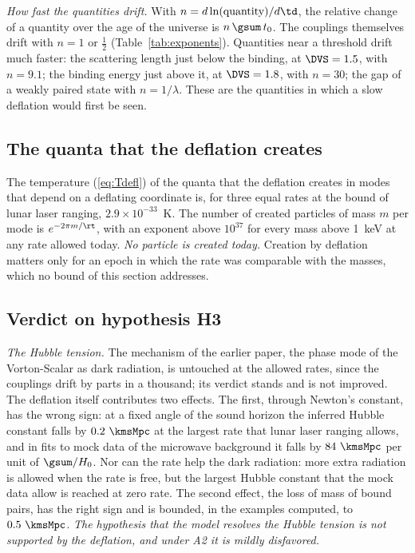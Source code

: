 \emph{How fast the quantities drift.} With $n=d\ln(\text{quantity})/d\td$, the relative change of a
quantity over the age of the universe is $n\,\gsum\,t_0$. The couplings themselves drift with $n=1$
or $\tfrac12$ (Table~\ref{tab:exponents}). Quantities near a threshold drift much faster: the
scattering length just below the binding, at $\DVS=1.5$, with $n=9.1$; the binding energy just above
it, at $\DVS=1.8$, with $n=30$; the gap of a weakly paired state with $n=1/\lambda$. These are the
quantities in which a slow deflation would first be seen.

\subsection{The quanta that the deflation creates}

The temperature (\ref{eq:Tdefl}) of the quanta that the deflation creates in modes that depend on a
deflating coordinate is, for three equal rates at the bound of lunar laser ranging,
$2.9\times10^{-33}$~K. The number of created particles of mass $m$ per mode is $e^{-2\pi m/\rt}$, with an
exponent above $10^{37}$ for every mass above 1~keV at any rate allowed today. \emph{No particle is
created today.} Creation by deflation matters only for an epoch in which the rate was comparable
with the masses, which no bound of this section addresses.

\subsection{Verdict on hypothesis H3}

\emph{The Hubble tension.} The mechanism of the earlier paper, the phase mode of the Vorton-Scalar
as dark radiation, is untouched at the allowed rates, since the couplings drift by parts in a
thousand; its verdict stands and is not improved. The deflation itself contributes two effects. The
first, through Newton's constant, has the wrong sign: at a fixed angle of the sound horizon the
inferred Hubble constant falls by $0.2~\kmsMpc$ at the largest rate that lunar laser ranging allows,
and in fits to mock data of the microwave background it falls by $84~\kmsMpc$ per unit of
$\gsum/H_0$. Nor can the rate help the dark radiation: more extra radiation is allowed when the rate
is free, but the largest Hubble constant that the mock data allow is reached at zero rate. The
second effect, the loss of mass of bound pairs, has the right sign and is bounded, in the examples
computed, to $0.5~\kmsMpc$. \emph{The hypothesis that the model resolves the Hubble tension is not
supported by the deflation, and under A2 it is mildly disfavored.}

